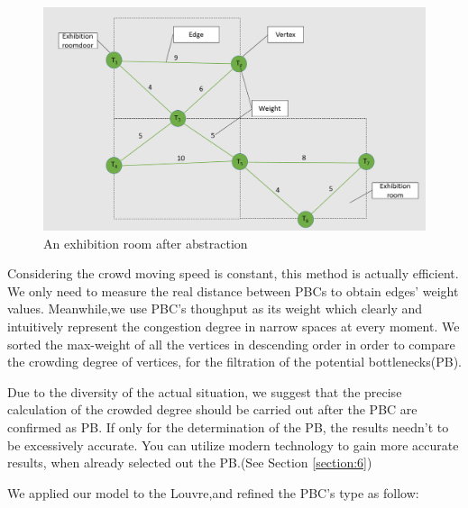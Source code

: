 \documentclass[12pt]{article}
\begin{document}
\begin{figure}[htb] 
	\centering
	\includegraphics[scale=0.23]{figure5.png}
	\caption{An exhibition room after abstraction}
	\label{fig:fig4}
\end{figure}


Considering the crowd moving speed is constant, this method is actually 
efficient. We only need to measure the real distance between PBCs to obtain edges' weight values.
Meanwhile,we use PBC's thoughput as its weight which clearly and intuitively represent the congestion degree in narrow spaces at every moment.
We sorted the max-weight of all the vertices in descending order in order to compare the crowding degree of vertices, for the filtration of the potential bottlenecks(PB).




Due to the diversity of the actual situation, we suggest that the precise calculation of the crowded degree should be carried out after the PBC are confirmed as PB.
If only for the determination of the PB, the results needn't to be excessively accurate. You can utilize modern technology to gain more accurate results, when already selected out the PB.(See Section \ref{section:6})


We applied our model to the Louvre,and refined the PBC's type as follow:
\end{document}
